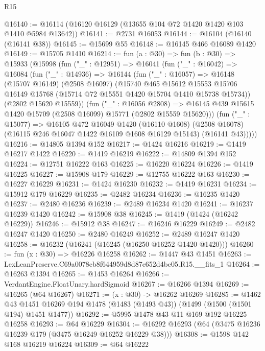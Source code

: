 \begin{lexlean}{R15}
\begin{coremodule}
@16140 := @16114 (@16120 @16129 (@13655 @104 @72 @1420 @1420 @103 @1410 @5984 @13642))
@16141 := @2731 @16053
@16144 := @16104 (@16140 (@16141 @38))
@16145 := @15699 @55
@16148 := @16145 @466 @16089 @1420
@16149 := @15705 @1410
@16214 := fun (a : @30) =>
  fun (b : @30) =>
  @15933
    (@15998
      (fun ("_" : @12951) =>
      @16041
        (fun ("_" : @16042) =>
        @16084
          (fun ("_" : @14936) =>
          @16144
            (fun ("_" : @16057) =>
            @16148
              (@15707 @16149)
              (@2508 @16097)
              (@15740
                @465
                @15612
                @15553
                @15706
                @16149
                @15768
                (@15714 @72 @15551 @1420 @15704 @1410 @15738 @15734))
              (@2802 @15620 @15559))
            (fun ("_" : @16056 @2808) =>
            @16145 @439 @15615 @1420 @15709 (@2508 @16099) @15771 (@2802 @15559 @15620)))
          (fun ("_" : @15077) =>
          @16105
            @472
            @16049
            @1420
            (@16110 @1608)
            (@2508 @16078)
            (@16115 @246 @16047 @1422 @16109 @1608 @16129 @15143)
            (@16141 @43)))))
@16216 := @14805 @1394 @152
@16217 := @1424 @16216
@16219 := @1419 @16217 @1422
@16220 := @1419 @16219
@16222 := @14809 @1394 @152
@16224 := @12751 @16222 @163
@16225 := @16220 @16224
@16226 := @1419 @16225
@16227 := @15908 @179
@16229 := @12755 @16222 @163
@16230 := @16227 @16229
@16231 := @1424 @16230
@16232 := @1419 @16231
@16234 := @15912 @179 @16229
@16235 := @2482 @16234
@16236 := @16235 @1420
@16237 := @2480 @16236
@16239 := @2489 @16234 @1420
@16241 := @16237 @16239 @1420
@16242 := @15908 @38
@16245 := @1419 (@1424 (@16242 @16229))
@16246 := @15912 @38
@16247 := @16246 @16229
@16249 := @2482 @16247 @1420
@16250 := @2480 @16249
@16252 := @2489 @16247 @1420
@16258 := @16232 (@16241 (@16245 (@16250 @16252 @1420 @1420)))
@16260 := fun (x : @30) => @16226 @16258
@16262 := @1447 @43 @1451
@16263 := LexLeanPreserve.C69a0078cb8f644959d8d87c652d4be05.R15.__fits_1
@16264 := @16263 @1394
@16265 := @1453 @16264
@16266 := VerdantEngine.FloatUnary.hardSigmoid
@16267 := @16266 @1394
@16269 := @16265 (@64 @16267)
@16271 := (x : @30) -> @16262 @16269
@16285 := @1462
    @43
    @1451
    @16269
    @194
    @1478
    (@1483 (@1493 @43))
    (@1499 (@1500 (@1501 @194) @1451 @1477))
@16292 := @5995 @1478 @43 @11 @169 @192 @16225 @16258
@16293 := @64 @16229
@16304 := @16292 @16293 (@64 (@3475 @16236 @16239 @179 (@3475 @16249 @16252 @16229 @38)))
@16308 := @1598 @142 @168 @16219 @16224
@16309 := @64 @16222

\end{coremodule}
\end{lexlean}
